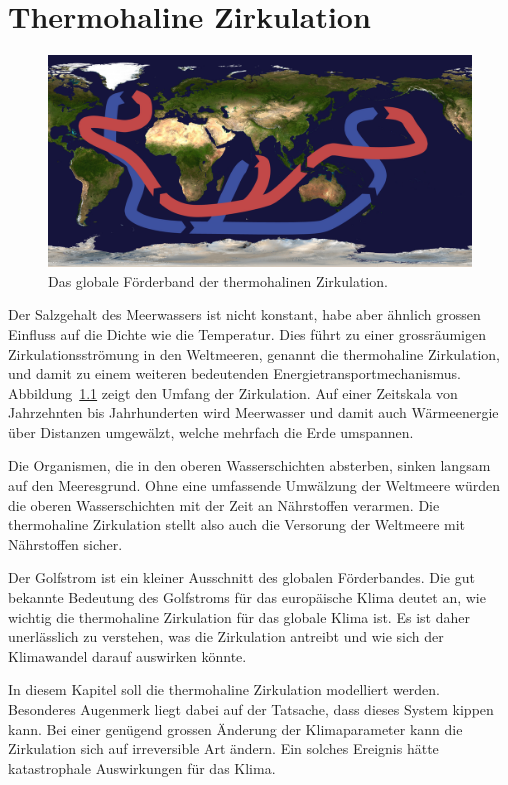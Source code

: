 %
%
%
\chapter{Thermohaline Zirkulation\label{chapter:thc}}
\begin{figure}
\centering
\includegraphics[width=\hsize]{chapters/4/1280px-Thermohaline_circulation.png}
\caption{
Das globale Förderband der thermohalinen Zirkulation.
\label{skript:thc:foerderband}}
\end{figure}%
Der Salzgehalt des Meerwassers ist nicht konstant,
habe aber ähnlich grossen Einfluss auf die Dichte wie die Temperatur.
Dies führt zu einer grossräumigen Zirkulationsströmung in den Weltmeeren,
genannt die thermohaline Zirkulation,
und damit zu einem weiteren bedeutenden Energietransportmechanismus.
Abbildung~\ref{skript:thc:foerderband} zeigt den Umfang der Zirkulation.
Auf einer Zeitskala von Jahrzehnten bis Jahrhunderten wird Meerwasser 
und damit auch Wärmeenergie über Distanzen umgewälzt, welche mehrfach die
Erde umspannen.

Die Organismen, die in den oberen Wasserschichten absterben, sinken langsam
auf den Meeresgrund.
Ohne eine umfassende Umwälzung der Weltmeere würden die oberen Wasserschichten
mit der Zeit an Nährstoffen verarmen.
Die thermohaline Zirkulation stellt also auch die Versorung der
Weltmeere mit Nährstoffen sicher.

Der Golfstrom ist ein kleiner Ausschnitt des globalen Förderbandes.
Die gut bekannte Bedeutung des Golfstroms für das europäische Klima 
deutet an, wie wichtig die thermohaline Zirkulation für das globale
Klima ist.
Es ist daher unerlässlich zu verstehen, was die Zirkulation antreibt und
wie sich der Klimawandel darauf auswirken könnte.

In diesem Kapitel soll die thermohaline Zirkulation modelliert werden.
Besonderes Augenmerk liegt dabei auf der Tatsache, dass dieses System
kippen kann.
Bei einer genügend grossen Änderung der Klimaparameter kann die Zirkulation
sich auf irreversible Art ändern.
Ein solches Ereignis hätte katastrophale Auswirkungen für das Klima.







